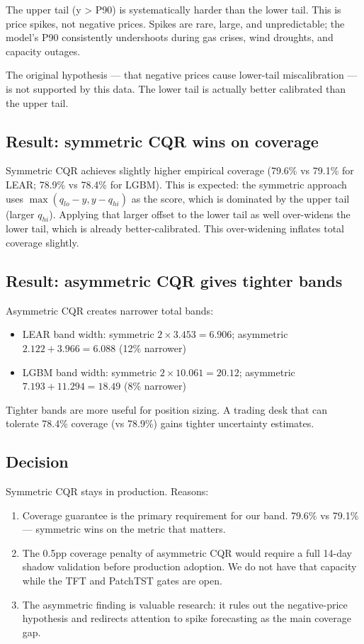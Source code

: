 The upper tail (y > P90) is systematically harder than the lower tail.
This is price spikes, not negative prices. Spikes are rare, large, and
unpredictable; the model's P90 consistently undershoots during gas crises,
wind droughts, and capacity outages.

The original hypothesis — that negative prices cause lower-tail miscalibration
— is not supported by this data. The lower tail is actually better calibrated
than the upper tail.

\subsection{Result: symmetric CQR wins on coverage}

Symmetric CQR achieves slightly higher empirical coverage (79.6\% vs 79.1\%
for LEAR; 78.9\% vs 78.4\% for LGBM). This is expected: the symmetric
approach uses $\max(q_{lo} - y, y - q_{hi})$ as the score, which is
dominated by the upper tail (larger $q_{hi}$). Applying that larger offset
to the lower tail as well over-widens the lower tail, which is already
better-calibrated. This over-widening inflates total coverage slightly.

\subsection{Result: asymmetric CQR gives tighter bands}

Asymmetric CQR creates narrower total bands:

\begin{itemize}
  \item LEAR band width: symmetric $2 \times 3.453 = 6.906$;
        asymmetric $2.122 + 3.966 = 6.088$ (12\% narrower)
  \item LGBM band width: symmetric $2 \times 10.061 = 20.12$;
        asymmetric $7.193 + 11.294 = 18.49$ (8\% narrower)
\end{itemize}

Tighter bands are more useful for position sizing. A trading desk that
can tolerate 78.4\% coverage (vs 78.9\%) gains tighter uncertainty estimates.

\subsection{Decision}

Symmetric CQR stays in production. Reasons:

\begin{enumerate}
  \item Coverage guarantee is the primary requirement for our band.
        79.6\% vs 79.1\% — symmetric wins on the metric that matters.
  \item The 0.5pp coverage penalty of asymmetric CQR would require
        a full 14-day shadow validation before production adoption.
        We do not have that capacity while the TFT and PatchTST gates
        are open.
  \item The asymmetric finding is valuable research:
        it rules out the negative-price hypothesis and redirects attention
        to spike forecasting as the main coverage gap.
\end{enumerate}


